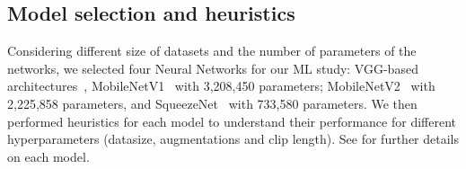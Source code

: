 \documentclass[mlabstract,twocolumn]{jmlr}
\begin{document}
\subsection{Model selection and heuristics}
Considering different size of datasets and the number of parameters of the networks, we selected four Neural Networks for our ML study:
VGG-based architectures~\citep{2015_Simonyan_ICLR}, MobileNetV1~\citep{2017-howared_CoRR_MobileNetV1} with 3,208,450 parameters; MobileNetV2~\citep{Sandler_2018_CVPR_MobileNetV2} with 2,225,858 parameters, and SqueezeNet~\citep{iandola2017squeezenet} with 733,580 parameters.
We then performed heuristics for each model to understand their performance for different hyperparameters (datasize, augmentations and clip length).
See  for further details on each model.
\end{document}
